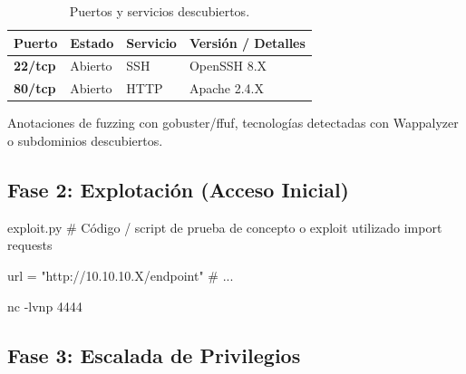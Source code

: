 \documentclass[../../../main_compilation.tex]{subfiles}
\begin{document}
\begin{table}[h!]
	\centering
	\small
	\begin{tabularx}{\textwidth}{l l l X}
		\toprule
		\rowcolor{csecDark} \textbf{\color{white}Puerto} & \textbf{\color{white}Estado} & \textbf{\color{white}Servicio} & \textbf{\color{white}Versión / Detalles} \\
		\midrule
		\textbf{22/tcp}                                  & Abierto                      & SSH                            & OpenSSH 8.X                              \\
		\textbf{80/tcp}                                  & Abierto                      & HTTP                           & Apache 2.4.X                             \\
		\bottomrule
	\end{tabularx}
	\caption{Puertos y servicios descubiertos.}
\end{table}

\begin{notebox}
	Anotaciones de fuzzing con gobuster/ffuf, tecnologías detectadas con Wappalyzer o subdominios descubiertos.
\end{notebox}

\subsection{Fase 2: Explotación (Acceso Inicial)}

\begin{codebox}[Python]{exploit.py}
	# Código / script de prueba de concepto o exploit utilizado
	import requests

	url = "http://10.10.10.X/endpoint"
	# ...
\end{codebox}

\begin{terminal}
	nc -lvnp 4444
\end{terminal}

\subsection{Fase 3: Escalada de Privilegios}
\end{document}
